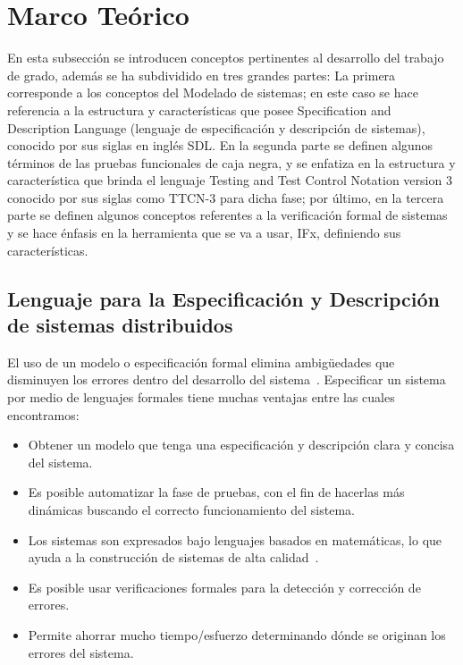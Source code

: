 
\section{Marco Te\'orico}

En esta subsecci\'on se introducen conceptos pertinentes al desarrollo del 
trabajo de grado, adem\'as se ha subdividido en tres grandes partes: La primera 
corresponde a los conceptos del Modelado de sistemas; en este caso se hace 
referencia a la estructura y caracter\'isticas que posee Specification and 
Description Language (lenguaje de especificaci\'on y descripci\'on de sistemas), 
conocido por sus siglas en ingl\'es SDL. En la segunda parte se definen algunos 
t\'erminos de las pruebas funcionales de caja negra, y se enfatiza en la 
estructura y caracter\'istica que brinda el lenguaje Testing and Test Control 
Notation version 3 conocido por sus siglas como TTCN-3 para dicha fase; por 
\'ultimo, en la tercera parte se definen algunos conceptos referentes a la 
verificaci\'on formal de sistemas y se hace \'enfasis en la herramienta que se 
va a usar, IFx, definiendo sus caracter\'isticas.

\subsection{Lenguaje para la Especificaci\'on y Descripci\'on de sistemas 
distribuidos}

El uso de un modelo o especificaci\'on formal elimina ambig\"uedades que 
disminuyen los errores dentro del desarrollo del sistema~\cite{Hierons2009}. 
Especificar un sistema por medio de lenguajes formales tiene muchas ventajas 
entre las cuales encontramos: 

\begin{itemize}
 \item Obtener un modelo que tenga una especificaci\'on y descripci\'on clara y 
concisa del sistema.
\item Es posible automatizar la fase de pruebas, con el fin de hacerlas m\'as 
din\'amicas buscando el correcto funcionamiento del sistema.
\item Los sistemas son expresados bajo lenguajes basados en matem\'aticas, lo 
que ayuda a la construcci\'on de sistemas de alta calidad~\cite{Hierons2009}.
\item Es posible usar verificaciones formales para la detecci\'on y 
correcci\'on de errores.
\item Permite ahorrar mucho tiempo/esfuerzo determinando d\'onde se originan 
los errores del sistema.
\end{itemize}

